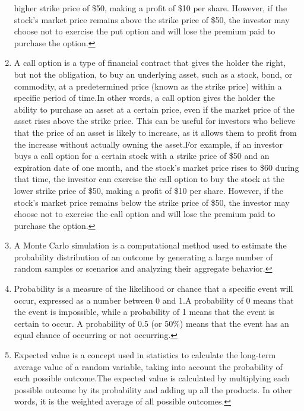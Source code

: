 \documentclass[
]{book}
\begin{document}
\begin{enumerate}
  higher strike price of \$50, making a profit of \$10 per share. However, if the
  stock's market price remains above the strike price of \$50, the investor may
  choose not to exercise the put option and will lose the premium paid to purchase
  the option.\protect\hyperlink{intro}{↩︎}
\item
  A call option is a type of financial contract that gives the holder the
  right, but not the obligation, to buy an underlying asset, such as a stock,
  bond, or commodity, at a predetermined price (known as the strike price) within
  a specific period of time.In other words, a call option gives the holder
  the ability to purchase an asset at a certain price, even if the market price of
  the asset rises above the strike price. This can be useful for investors who
  believe that the price of an asset is likely to increase, as it allows them to
  profit from the increase without actually owning the asset.For example,
  if an investor buys a call option for a certain stock with a strike price of
  \$50 and an expiration date of one month, and the stock's market price rises to
  \$60 during that time, the investor can exercise the call option to buy the
  stock at the lower strike price of \$50, making a profit of \$10 per share.
  However, if the stock's market price remains below the strike price of \$50,
  the investor may choose not to exercise the call option and will lose the
  premium paid to purchase the option.\protect\hyperlink{intro}{↩︎}
\item
  A Monte Carlo simulation is a computational method used to estimate the
  probability distribution of an outcome by generating a large number of random
  samples or scenarios and analyzing their aggregate behavior.\protect\hyperlink{intro}{↩︎}
\item
  Probability is a measure of the likelihood or chance that a specific event
  will occur, expressed as a number between 0 and 1.A probability of 0
  means that the event is impossible, while a probability of 1 means that the
  event is certain to occur. A probability of 0.5 (or 50\%) means that the event
  has an equal chance of occurring or not occurring.\protect\hyperlink{intro}{↩︎}
\item
  Expected value is a concept used in statistics to calculate the long-term
  average value of a random variable, taking into account the probability of each
  possible outcome.The expected value is calculated by multiplying each
  possible outcome by its probability and adding up all the products. In other
  words, it is the weighted average of all possible outcomes.\protect\hyperlink{intro}{↩︎}
\end{enumerate}
\end{document}
